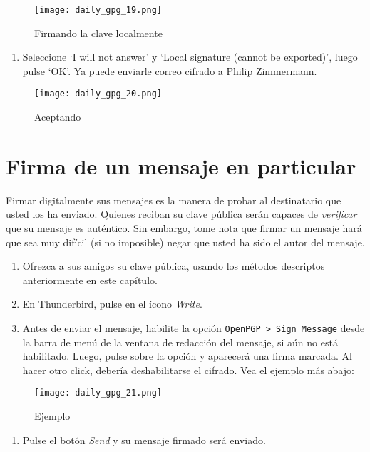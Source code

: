 \documentclass[10pt,a5paper,twoside,,]{book}
\providecommand{\tightlist}{%
  \setlength{\itemsep}{0pt}\setlength{\parskip}{0pt}}
\begin{document}
\begin{figure}[htbp]
\centering
\texttt{[image: daily\_gpg\_19.png]}
\caption{Firmando la clave localmente}
\end{figure}

\begin{enumerate}
\def\labelenumi{\arabic{enumi}.}
\setcounter{enumi}{6}
\tightlist
\item
  Seleccione `I will not answer' y `Local signature (cannot be
  exported)', luego pulse `OK'. Ya puede enviarle correo cifrado a
  Philip Zimmermann.
\end{enumerate}

\begin{figure}[htbp]
\centering
\texttt{[image: daily\_gpg\_20.png]}
\caption{Aceptando}
\end{figure}

\section{Firma de un mensaje en
particular}\label{firma-de-un-mensaje-en-particular}

Firmar digitalmente sus mensajes es la manera de probar al destinatario
que usted los ha enviado. Quienes reciban su clave pública serán capaces
de \emph{verificar} que su mensaje es auténtico. Sin embargo, tome nota
que firmar un mensaje hará que sea muy difícil (si no imposible) negar
que usted ha sido el autor del mensaje.

\begin{enumerate}
\def\labelenumi{\arabic{enumi}.}
\item
  Ofrezca a sus amigos su clave pública, usando los métodos descriptos
  anteriormente en este capítulo.
\item
  En Thunderbird, pulse en el ícono \emph{Write}.
\item
  Antes de enviar el mensaje, habilite la opción
  \texttt{OpenPGP\ \textgreater{}\ Sign\ Message} desde la barra de menú
  de la ventana de redacción del mensaje, si aún no está habilitado.
  Luego, pulse sobre la opción y aparecerá una firma marcada. Al hacer
  otro click, debería deshabilitarse el cifrado. Vea el ejemplo más
  abajo:
\end{enumerate}

\begin{figure}[htbp]
\centering
\texttt{[image: daily\_gpg\_21.png]}
\caption{Ejemplo}
\end{figure}

\begin{enumerate}
\def\labelenumi{\arabic{enumi}.}
\setcounter{enumi}{3}
\tightlist
\item
  Pulse el botón \emph{Send} y su mensaje firmado será enviado.
\end{enumerate}
\end{document}
